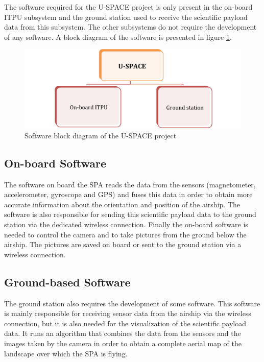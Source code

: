 The software required for the \ac{U-SPACE} project is only present in the on-board \ac{ITPU} subsystem and the ground station used to receive the scientific payload data from this subsystem. The other subsystems do not require the development of any software. A block diagram of the software is presented in figure \ref{fig:software_block}.

\begin{figure}[htbp!]
\centering
\includegraphics[width=\textwidth]{figures/software_block.png}
\caption{Software block diagram of the U-SPACE project}
\label{fig:software_block}
\end{figure}

\pagebreak

\subsection{On-board Software}

The software on board the \ac{SPA} reads the data from the sensors (magnetometer, accelerometer, gyroscope and \ac{GPS}) and fuses this data in order to obtain more accurate information about the orientation and position of the airship. The software is also responsible for sending this scientific payload data to the ground station via the dedicated wireless connection. Finally the on-board software is needed to control the camera and to take pictures from the ground below the airship. The pictures are saved on board or sent to the ground station via a wireless connection.

\subsection{Ground-based Software}

The ground station also requires the development of some software. This software is mainly responsible for receiving sensor data from the airship via the wireless connection, but it is also needed for the visualization of the scientific payload data. It runs an algorithm that combines the data from the sensors and the images taken by the camera in order to obtain a complete aerial map of the landscape over which the \ac{SPA} is flying.

